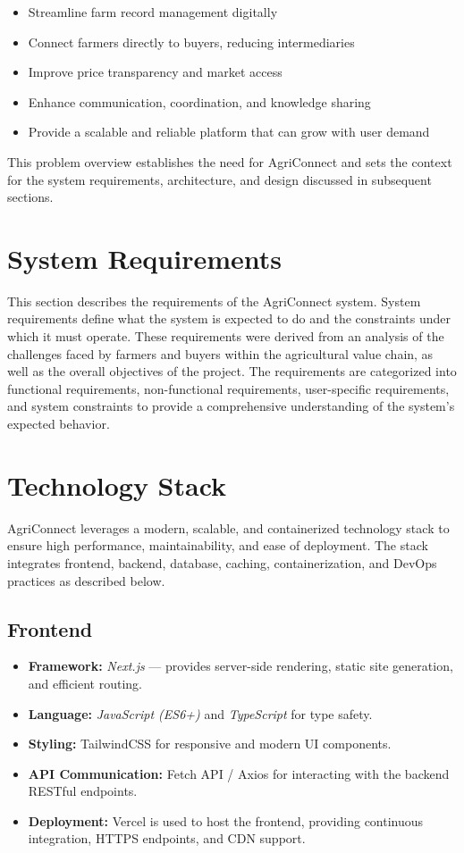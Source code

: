 \documentclass[12pt,a4paper]{article}
\begin{document}
\begin{itemize}
    \item Streamline farm record management digitally
    \item Connect farmers directly to buyers, reducing intermediaries
    \item Improve price transparency and market access
    \item Enhance communication, coordination, and knowledge sharing
    \item Provide a scalable and reliable platform that can grow with user demand
\end{itemize}

This problem overview establishes the need for AgriConnect and sets the context for the system requirements, architecture, and design discussed in subsequent sections.

\section{System Requirements}

This section describes the requirements of the AgriConnect system. System requirements define what the system is expected to do and the constraints under which it must operate. These requirements were derived from an analysis of the challenges faced by farmers and buyers within the agricultural value chain, as well as the overall objectives of the project. The requirements are categorized into functional requirements, non-functional requirements, user-specific requirements, and system constraints to provide a comprehensive understanding of the system’s expected behavior.

\section{Technology Stack}

AgriConnect leverages a modern, scalable, and containerized technology stack to ensure high performance, maintainability, and ease of deployment. The stack integrates frontend, backend, database, caching, containerization, and DevOps practices as described below.

\subsection{Frontend}
\begin{itemize}
    \item \textbf{Framework:} \textit{Next.js} — provides server-side rendering, static site generation, and efficient routing.
    \item \textbf{Language:} \textit{JavaScript (ES6+)} and \textit{TypeScript} for type safety.
    \item \textbf{Styling:} TailwindCSS for responsive and modern UI components.
    \item \textbf{API Communication:} Fetch API / Axios for interacting with the backend RESTful endpoints.
    \item \textbf{Deployment:} Vercel is used to host the frontend, providing continuous integration, HTTPS endpoints, and CDN support.
\end{itemize}
\end{document}
